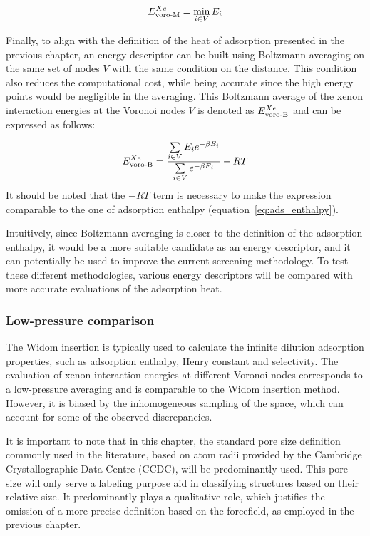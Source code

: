 \documentclass[main]{subfiles}
\begin{document}
\begin{equation}
    E_{\text{voro-M}}^{Xe} = \min_{i \in V} E_i
\end{equation}

Finally, to align with the definition of the heat of adsorption presented in the previous chapter, an energy descriptor can be built using Boltzmann averaging on the same set of nodes $V$ with the same condition on the distance. This condition also reduces the computational cost, while being accurate since the high energy points would be negligible in the averaging. This Boltzmann average of the xenon interaction energies at the Voronoi nodes $V$ is denoted as $E_{\text{voro-B}}^{Xe}$ and can be expressed as follows:

\begin{equation}
    E_{\text{voro-B}}^{Xe} = \dfrac{\sum\limits_{i \in V} E_i e^{-\beta E_i}}{\sum\limits_{i \in V} e^{-\beta E_i}} -RT
\end{equation}
It should be noted that the $-RT$ term is necessary to make the expression comparable to the one of adsorption enthalpy (equation~\ref{eq:ads_enthalpy}). 

Intuitively, since Boltzmann averaging is closer to the definition of the adsorption enthalpy, it would be a more suitable candidate as an energy descriptor, and it can potentially be used to improve the current screening methodology. To test these different methodologies, various energy descriptors will be compared with more accurate evaluations of the adsorption heat. 

\subsubsection{Low-pressure comparison}

The Widom insertion is typically used to calculate the infinite dilution adsorption properties, such as adsorption enthalpy, Henry constant and selectivity. The evaluation of xenon interaction energies at different Voronoi nodes corresponds to a low-pressure averaging and is comparable to the Widom insertion method. However, it is biased by the inhomogeneous sampling of the space, which can account for some of the observed discrepancies.

It is important to note that in this chapter, the standard pore size definition commonly used in the literature, based on atom radii provided by the Cambridge Crystallographic Data Centre (CCDC), will be predominantly used. This pore size will only serve a labeling purpose aid in classifying structures based on their relative size. It predominantly plays a qualitative role, which justifies the omission of a more precise definition based on the forcefield, as employed in the previous chapter.
\end{document}
